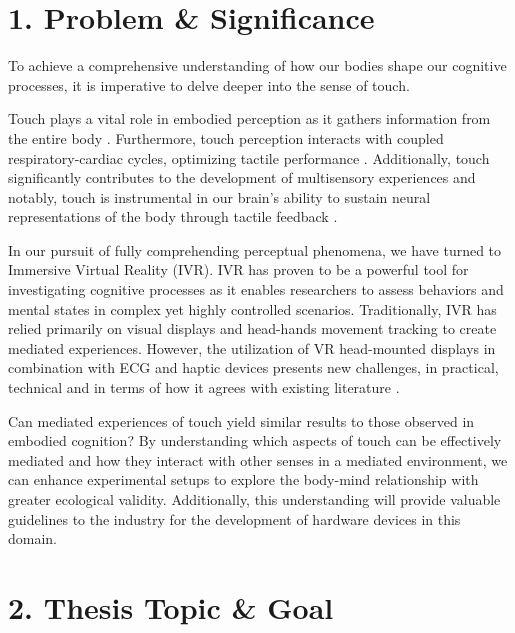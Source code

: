 \documentclass[12pt,oneside,openright]{report}
\begin{document}
\section*{1. Problem \& Significance}

To achieve a comprehensive understanding of how our bodies shape our cognitive processes, it is imperative to delve deeper into the sense of touch\cite{Hofmann2021}. 

Touch plays a vital role in embodied perception as it gathers information from the entire body \cite*{Field2014}.  Furthermore, touch perception interacts with coupled respiratory-cardiac cycles, optimizing tactile performance \cite{Grund643,esra,motyka}.  Additionally, touch significantly contributes to the development of multisensory experiences \cite{BREMNER2017227,SALTAFOSSI2023108642} and notably, touch is instrumental in our brain's ability to sustain neural representations of the body through tactile feedback \cite{Cole2016}.

In our pursuit of fully comprehending perceptual phenomena, we have turned to Immersive Virtual Reality (IVR). IVR has proven to be a powerful tool for investigating cognitive processes as it enables researchers to assess behaviors and mental states in complex yet highly controlled scenarios. Traditionally, IVR has relied primarily on visual displays and head-hands movement tracking to create mediated experiences. However, the utilization of VR head-mounted displays in combination with ECG and haptic devices presents new challenges, in practical, technical and in terms of how it agrees with existing literature \cite*{Klotzsche2023}.

Can mediated experiences of touch yield similar results to those observed in embodied cognition? By understanding which aspects of touch can be effectively mediated and how they interact with other senses in a mediated environment, we can enhance experimental setups to explore the body-mind relationship with greater ecological validity. Additionally, this understanding will provide valuable guidelines to the industry for the development of hardware devices in this domain.

\section*{2. Thesis Topic \& Goal}
\end{document}
